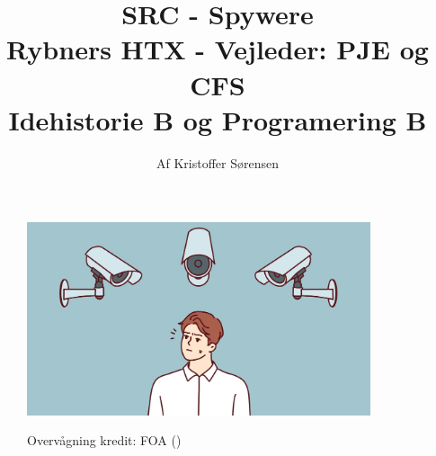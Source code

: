
\title{
    SRC - Spywere \\ 
    \large{Rybners HTX - Vejleder: PJE og CFS} \\
    \small{Idehistorie B og Programering B}
}

\author{Af Kristoffer Sørensen}
\maketitle
\thispagestyle{empty}
\begin{figure}[h!]
    \centering
    \includegraphics[width=0.9\textwidth]{figurs/overvaning.jpg}
    \label{fig:Forsideimg}
    \caption{Overvågning kredit: FOA (\cite{foa})}
\end{figure}
\newpage
